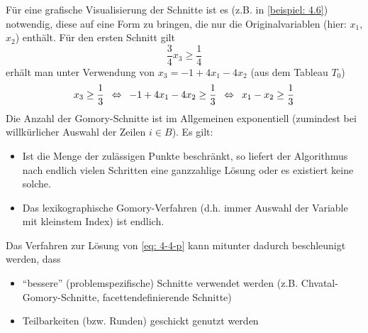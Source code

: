 Für eine grafische Visualisierung der Schnitte ist es (z.B. in \cref{beispiel: 4.6}) notwendig, diese auf eine Form zu bringen, die nur die Originalvariablen (hier: $x_1$, $x_2$) enthält. Für den ersten Schnitt gilt
\begin{equation*}
	\frac{3}{4} x_3 \ge \frac{1}{4} 
\end{equation*}
erhält man unter Verwendung von $x_3 = -1 + 4x_1 - 4x_2$ (aus dem Tableau $T_0$)
\begin{equation*}
	x_3 \ge \frac{1}{3} \enskip \Leftrightarrow \enskip -1 + 4x_1 - 4x_2 \ge \frac{1}{3} \enskip \Leftrightarrow \enskip x_1 - x_2 \ge \frac{1}{3}
\end{equation*}
Die Anzahl der Gomory-Schnitte ist im Allgemeinen exponentiell (zumindest bei willkürlicher Auswahl der Zeilen $i \in B$). Es gilt:
\begin{itemize}[nolistsep, topsep=-\parskip]
	\item Ist die Menge der zulässigen Punkte beschränkt, so liefert der Algorithmus nach endlich vielen Schritten eine ganzzahlige Lösung oder es existiert keine solche.
	\item Das lexikographische Gomory-Verfahren (d.h. immer Auswahl der Variable mit kleinstem Index) ist endlich.
\end{itemize}
\vspace{\parskip}

Das Verfahren zur Lösung von \eqref{eq: 4-4-p} kann mitunter dadurch beschleunigt werden, dass 
\begin{itemize}[nolistsep, topsep=-\parskip]
	\item \enquote{bessere} (problemspezifische) Schnitte verwendet werden (z.B. Chvatal-Gomory-Schnitte, facettendefinierende Schnitte)
	\item Teilbarkeiten (bzw. Runden) geschickt genutzt werden
\end{itemize}
\vspace{\parskip}

